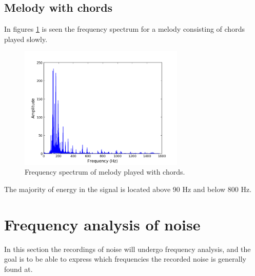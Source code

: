 \subsection{Melody with chords}
In figures \ref{fig:melody_chords} is seen the frequency spectrum for a melody consisting of chords played slowly.
\begin{figure}[H]
\centering
\includegraphics[width=0.7\textwidth]{figures/freqanal/melody_chords.png}
\caption{Frequency spectrum of melody played with chords.}
\label{fig:melody_chords}
\end{figure}
The majority of energy in the signal is located above 90 Hz and below 800 Hz.

\section{Frequency analysis of noise}
In this section the recordings of noise will undergo frequency analysis, and the goal is to be able to express which frequencies the recorded noise is generally found at.
